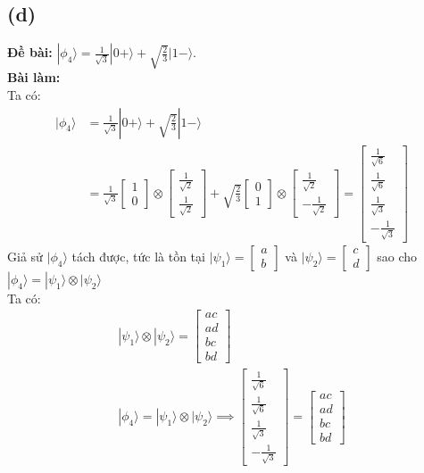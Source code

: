 \subsection{(d)}
\textbf{Đề bài:} $|\phi_{4}\rangle=\frac{1}{\sqrt{3}}|0+\rangle+\sqrt{\frac{2}{3}}|1-\rangle$.\\
\textbf{Bài làm:}\\
Ta có:
\begin{align*}
|\phi_{4}\rangle&=\frac{1}{\sqrt{3}}|0+\rangle+\sqrt{\frac{2}{3}}|1-\rangle\\
&= \frac{1}{\sqrt{3}} \begin{bmatrix}
    1\\0
\end{bmatrix} \otimes \begin{bmatrix}
    \frac{1}{\sqrt{2}} \\ \frac{1}{\sqrt{2}}
\end{bmatrix}
+ \sqrt{\frac{2}{3}} \begin{bmatrix}
    0\\1
\end{bmatrix} \otimes \begin{bmatrix}
    \frac{1}{\sqrt{2}} \\ -\frac{1}{\sqrt{2}}
\end{bmatrix}
= \begin{bmatrix}
    \frac{1}{\sqrt{6}}\\
    \frac{1}{\sqrt{6}}\\
    \frac{1}{\sqrt{3}}\\
    -\frac{1}{\sqrt{3}}
\end{bmatrix}
\end{align*}
Giả sử $|\phi_{4}\rangle$ tách được, tức là tồn tại $|\psi_1\rangle=\begin{bmatrix}a\\b\end{bmatrix}$ và $|\psi_2\rangle=\begin{bmatrix}c\\d\end{bmatrix}$ sao cho $|\phi_{4}\rangle=|\psi_1\rangle \otimes |\psi_2\rangle$\\
Ta có:
\begin{align*}
    |\psi_1\rangle \otimes |\psi_2\rangle = \begin{bmatrix}
        ac\\
        ad\\
        bc\\
        bd
    \end{bmatrix}\\
    |\phi_{4}\rangle=|\psi_1\rangle \otimes |\psi_2\rangle
    \implies \begin{bmatrix}
    \frac{1}{\sqrt{6}}\\
    \frac{1}{\sqrt{6}}\\
    \frac{1}{\sqrt{3}}\\
    -\frac{1}{\sqrt{3}}
\end{bmatrix} = \begin{bmatrix}
        ac\\
        ad\\
        bc\\
        bd
    \end{bmatrix}
\end{align*}
